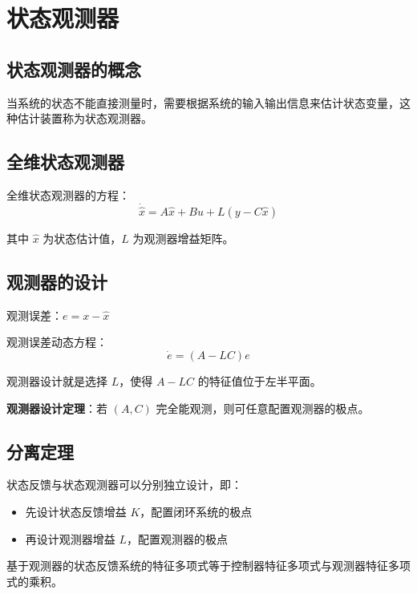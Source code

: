 \section{状态观测器}

\subsection{状态观测器的概念}
当系统的状态不能直接测量时，需要根据系统的输入输出信息来估计状态变量，这种估计装置称为状态观测器。

\subsection{全维状态观测器}
全维状态观测器的方程：
\[\dot{\hat{x}} = A\hat{x} + Bu + L(y - C\hat{x})\]

其中 $\hat{x}$ 为状态估计值，$L$ 为观测器增益矩阵。

\subsection{观测器的设计}
观测误差：$e = x - \hat{x}$

观测误差动态方程：
\[\dot{e} = (A - LC)e\]

观测器设计就是选择 $L$，使得 $A - LC$ 的特征值位于左半平面。

\textbf{观测器设计定理}：若 $(A, C)$ 完全能观测，则可任意配置观测器的极点。

\subsection{分离定理}
状态反馈与状态观测器可以分别独立设计，即：
\begin{itemize}
    \item 先设计状态反馈增益 $K$，配置闭环系统的极点
    \item 再设计观测器增益 $L$，配置观测器的极点
\end{itemize}

基于观测器的状态反馈系统的特征多项式等于控制器特征多项式与观测器特征多项式的乘积。
